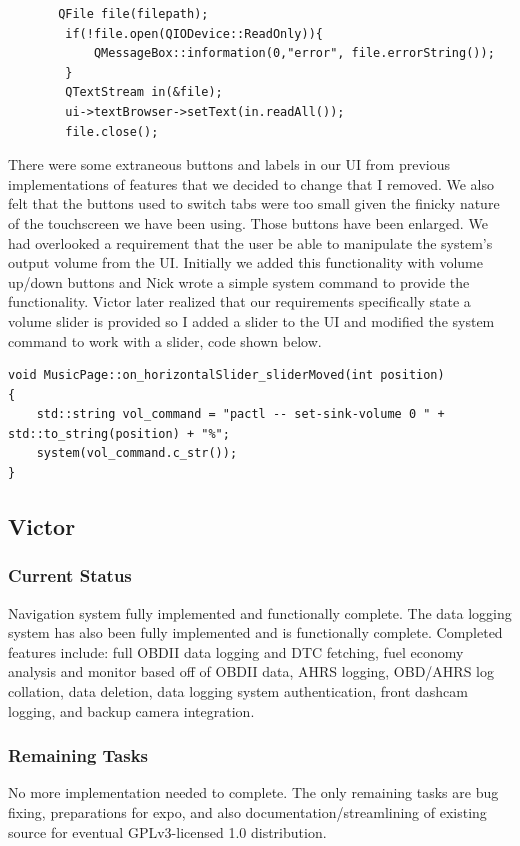 \documentclass[onecolumn, draftclsnofoot, 10pt, compsoc]{IEEEtran}
\begin{document}
\begin{verbatim}
       QFile file(filepath);
        if(!file.open(QIODevice::ReadOnly)){
            QMessageBox::information(0,"error", file.errorString());
        }
        QTextStream in(&file);
        ui->textBrowser->setText(in.readAll());
        file.close();
\end{verbatim}

There were some extraneous buttons and labels in our UI from previous implementations of features that we decided to change that I removed. We also felt that the buttons used to switch tabs were too small given the finicky nature of the touchscreen we have been using. Those buttons have been enlarged. We had overlooked a requirement that the user be able to manipulate the system's output volume from the UI. Initially we added this functionality with volume up/down buttons and Nick wrote a simple system command to provide the functionality. Victor later realized that our requirements specifically state a volume slider is provided so I added a slider to the UI and modified the system command to work with a slider, code shown below.\par

\begin{verbatim}
void MusicPage::on_horizontalSlider_sliderMoved(int position)
{
    std::string vol_command = "pactl -- set-sink-volume 0 " + std::to_string(position) + "%";
    system(vol_command.c_str());
}
\end{verbatim}

\newpage

\subsection{Victor}
\subsubsection{Current Status}
Navigation system fully implemented and functionally complete. The data logging system has also been fully implemented and is functionally complete. Completed features include: full OBDII data logging and DTC fetching, fuel economy analysis and monitor based off of OBDII data, AHRS logging, OBD/AHRS log collation, data deletion, data logging system authentication, front dashcam logging, and backup camera integration. 

\subsubsection{Remaining Tasks}
No more implementation needed to complete. The only remaining tasks are bug fixing, preparations for expo, and also documentation/streamlining of existing source for eventual GPLv3-licensed 1.0 distribution.
\end{document}
